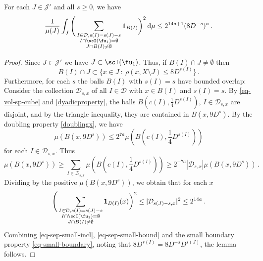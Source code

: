     \begin{lemma}
        \label{square-function-count}
        \leanok
        For each $J \in \mathcal{J}'$ and all $s \ge 0$, we have
        $$
            \frac{1}{\mu(J)} \int_J \Bigg(\sum_{\substack{I \in \mathcal{D}, s(I) = s(J) - s\\ I \cap \scI(\fu_1) = \emptyset\\
        J \cap B(I) \ne \emptyset}} \mathbf{1}_{B(I)}\bigg)^2 \, \mathrm{d}\mu \le 2^{14a+1} (8 D^{-s})^\kappa\,.
        $$
    \end{lemma}

    \begin{proof}
        Since $J \in \mathcal{J}'$ we have $J \subset \scI(\fu_1)$. Thus, if $B(I) \cap J \ne \emptyset$ then
    \begin{equation}
        \label{eq-sep-small-incl}
        B(I) \cap J \subset \{x \in J \ : \ \rho(x, X \setminus J) \le 8D^{s(I)}\}\,.
    \end{equation}
    Furthermore, for each $s$ the balls $B(I)$ with $s(I) = s$ have bounded overlap: Consider the collection $\mathcal{D}_{s,x}$ of all $I \in \mathcal{D}$ with $x \in B(I)$ and $s(I) = s$. By \eqref{eq-vol-sp-cube} and \eqref{dyadicproperty}, the balls $B(c(I), \frac{1}{4} D^{s(I)})$, $I \in \mathcal{D}_{s,x}$ are disjoint, and by the triangle inequality, they are contained in $B(x, 9 D^{s})$. By the doubling property \eqref{doublingx}, we have
    $$
        \mu(B(x, 9D^{s})) \le 2^{7a} \mu(B(c(I), \frac{1}{4} D^{s(I)}))
    $$
    for each $I \in \mathcal{D}_{s,x}$.
    Thus
    $$
        \mu(B(x, 9D^{s})) \ge \sum_{I \in \mathcal{D}_{s,x}} \mu(B(c(I), \frac{1}{4} D^{s(I)})) \ge 2^{-7a} |\mathcal{D}_{s,x}| \mu(B(x, 9D^{s}))\,.
    $$
    Dividing by the positive $\mu(B(x, 9D^{s}))$, we obtain that for each $x$
    \begin{equation}
        \label{eq-sep-small-bound}
        \Bigg(\sum_{\substack{I \in \mathcal{D}, s(I) = s(J) - s\\ I \cap \scI(\fu_1) = \emptyset\\
        J \cap B(I) \ne \emptyset}} \mathbf{1}_{B(I)}(x) \bigg)^2 \le |\mathcal{D}_{s(J) - s,x}|^2 \le 2^{14a} \,.
    \end{equation}
    Combining \eqref{eq-sep-small-incl}, \eqref{eq-sep-small-bound} and the small boundary property \eqref{eq-small-boundary}, noting that $8D^{s(I)}=8D^{-s}D^{s(J)}$, the lemma follows.
\end{proof}


